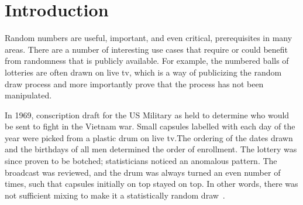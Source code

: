 \section{Introduction}\label{cha:introduction}

Random numbers are useful, important, and even critical, prerequisites in many areas.
There are a number of interesting use cases that require or could benefit from randomness that is publicly available. For example, the numbered balls of lotteries are often drawn on live tv, which is a way of publicizing the random draw process and more importantly prove that the process has not been manipulated.


In 1969,  conscription draft for the US Military as held to determine who would be sent to fight in the Vietnam war. Small capsules labelled with each day of the year were picked from a plastic drum on live tv.The ordering of the dates drawn and the birthdays of all men determined the order of enrollment.
The lottery was since proven to be botched; statisticians noticed an anomalous pattern.
The broadcast was reviewed, and the drum was always turned an even number of times, such that capsules initially on top stayed on top.
In other words, there was not sufficient mixing to make it a statistically random draw~\cite{princeton2016}.

